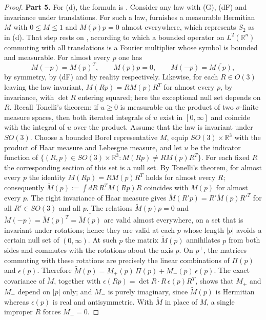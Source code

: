 \documentclass[11pt,letterpaper,reqno]{amsart}
\theoremstyle{definition}
\begin{document}
\begin{proof}
\textbf{Part 5.}
For (d), the formula is \cite[Theorem~44\,(D2) with (C7)]{QEDIII}.
Consider any law with (G), (dF) and invariance under translations.
For such a law, \cite[proof of Theorem~14.26, Step~7]{QEDII} furnishes a measurable Hermitian $M$ with $0\le M\le1$ and $M(p)p=0$ almost everywhere, which represents $S_2$ as in (d).
That step rests on \cite[Chapter~I, Theorem~3.18]{SteinWeiss1971}, according to which a bounded operator on $L^2(\mathbb R^n)$ commuting with all translations is a Fourier multiplier whose symbol is bounded and measurable.
For almost every $p$ one has
\begin{equation*}
M(-p)=M(p)^T,\qquad M(p)p=0,\qquad M(-p)=\overline{M(p)},
\end{equation*}
by symmetry, by (dF) and by reality respectively.
Likewise, for each $R\in O(3)$ leaving the law invariant, $M(Rp)=RM(p)R^T$ for almost every $p$, by invariance, with $\det R$ entering squared; here the exceptional null set depends on $R$.
Recall Tonelli's theorem: if $u\ge0$ is measurable on the product of two $\sigma$-finite measure spaces, then both iterated integrals of $u$ exist in $[0,\infty]$ and coincide with the integral of $u$ over the product.
Assume that the law is invariant under $SO(3)$.
Choose a bounded Borel representative $M$, equip $SO(3)\times\mathbb R^3$ with the product of Haar measure and Lebesgue measure, and let $u$ be the indicator function of $\{(R,p)\in SO(3)\times\mathbb R^3:M(Rp)\ne RM(p)R^T\}$.
For each fixed $R$ the corresponding section of this set is a null set.
By Tonelli's theorem, for almost every $p$ the identity $M(Rp)=RM(p)R^T$ holds for almost every $R$; consequently $\tilde M(p):=\int dR\,R^TM(Rp)R$ coincides with $M(p)$ for almost every $p$.
The right invariance of Haar measure gives $\tilde M(R'p)=R'\tilde M(p)R'^T$ for all $R'\in SO(3)$ and all $p$.
The relations $\tilde M(p)p=0$ and $\tilde M(-p)=\tilde M(p)^T=\overline{\tilde M(p)}$ are valid almost everywhere, on a set that is invariant under rotations; hence they are valid at each $p$ whose length $|p|$ avoids a certain null set of $(0,\infty)$.
At such $p$ the matrix $\tilde M(p)$ annihilates $p$ from both sides and commutes with the rotations about the axis $p$.
On $p^\perp$, the matrices commuting with these rotations are precisely the linear combinations of $\Pi(p)$ and $\epsilon(p)$.
Therefore $\tilde M(p)=M_+(p)\,\Pi(p)+M_-(p)\,\epsilon(p)$.
The exact covariance of $\tilde M$, together with $\epsilon(Rp)=\det R\cdot R\,\epsilon(p)R^T$, shows that $M_+$ and $M_-$ depend on $|p|$ only; and $M_-$ is purely imaginary, since $\tilde M(p)$ is Hermitian whereas $\epsilon(p)$ is real and antisymmetric.
With $\tilde M$ in place of $M$, a single improper $R$ forces $M_-=0$.


\end{proof}
\end{document}

